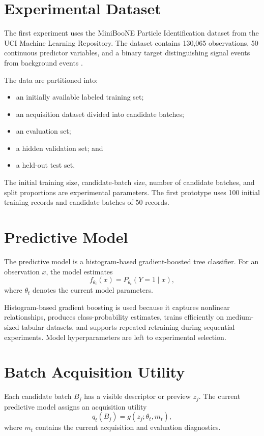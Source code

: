 \documentclass[11pt,letterpaper]{article}
\begin{document}
\section{Experimental Dataset}

The first experiment uses the MiniBooNE Particle Identification dataset from
the UCI Machine Learning Repository. The dataset contains 130,065
observations, 50 continuous predictor variables, and a binary target
distinguishing signal events from background events \cite{miniboone}.

The data are partitioned into:
\begin{itemize}[nosep]
    \item an initially available labeled training set;
    \item an acquisition dataset divided into candidate batches;
    \item an evaluation set;
    \item a hidden validation set; and
    \item a held-out test set.
\end{itemize}

The initial training size, candidate-batch size, number of candidate batches,
and split proportions are experimental parameters. The first prototype uses
100 initial training records and candidate batches of 50 records.

\section{Predictive Model}

The predictive model is a histogram-based gradient-boosted tree classifier.
For an observation \(x\), the model estimates
\[
    f_{\theta_t}(x)=P_{\theta_t}(Y=1\mid x),
\]
where \(\theta_t\) denotes the current model parameters.

Histogram-based gradient boosting is used because it captures nonlinear
relationships, produces class-probability estimates, trains efficiently on
medium-sized tabular datasets, and supports repeated retraining during
sequential experiments. Model hyperparameters are left to experimental
selection.

\section{Batch Acquisition Utility}

Each candidate batch \(B_j\) has a visible descriptor or preview \(z_j\). The
current predictive model assigns an acquisition utility
\[
    q_t(B_j)=g(z_j;\theta_t,m_t),
\]
where \(m_t\) contains the current acquisition and evaluation diagnostics.
\end{document}
